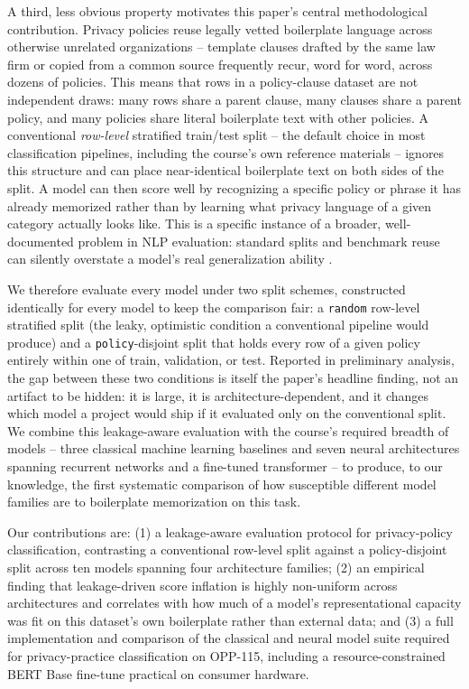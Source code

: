\documentclass[11pt]{acl}
\begin{document}
A third, less obvious property motivates this paper's central methodological
contribution. Privacy policies reuse legally vetted boilerplate language across
otherwise unrelated organizations -- template clauses drafted by the same law firm or
copied from a common source frequently recur, word for word, across dozens of policies.
This means that rows in a policy-clause dataset are not independent draws: many rows
share a parent clause, many clauses share a parent policy, and many policies share
literal boilerplate text with other policies. A conventional \emph{row-level} stratified
train/test split -- the default choice in most classification pipelines, including the
course's own reference materials -- ignores this structure and can place near-identical
boilerplate text on both sides of the split. A model can then score well by recognizing
a specific policy or phrase it has already memorized rather than by learning what
privacy language of a given category actually looks like. This is a specific instance
of a broader, well-documented problem in NLP evaluation: standard splits and
benchmark reuse can silently overstate a model's real generalization ability
\cite{gorman-bedrick-2019-need,lewis-etal-2021-question}.

We therefore evaluate every model under two split schemes, constructed identically for
every model to keep the comparison fair: a \texttt{random} row-level stratified split
(the leaky, optimistic condition a conventional pipeline would produce) and a
\texttt{policy}-disjoint split that holds every row of a given policy entirely within one
of train, validation, or test. Reported in preliminary analysis, the gap between these
two conditions is itself the paper's headline finding, not an artifact to be hidden: it
is large, it is architecture-dependent, and it changes which model a project would ship
if it evaluated only on the conventional split. We combine this leakage-aware evaluation
with the course's required breadth of models -- three classical machine learning
baselines and seven neural architectures spanning recurrent networks and a fine-tuned
transformer -- to produce, to our knowledge, the first systematic comparison of how
susceptible different model families are to boilerplate memorization on this task.

Our contributions are: (1) a leakage-aware evaluation protocol for privacy-policy
classification, contrasting a conventional row-level split against a policy-disjoint
split across ten models spanning four architecture families; (2) an empirical finding
that leakage-driven score inflation is highly non-uniform across architectures and
correlates with how much of a model's representational capacity was fit on this
dataset's own boilerplate rather than external data; and (3) a full implementation and
comparison of the classical and neural model suite required for privacy-practice
classification on OPP-115, including a resource-constrained BERT Base fine-tune
practical on consumer hardware.
\end{document}
